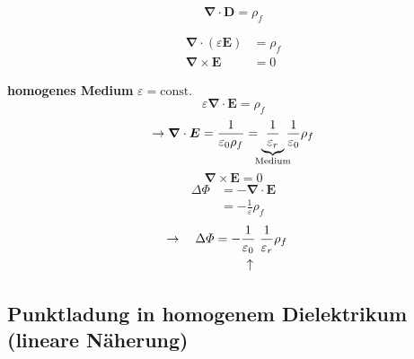 \documentclass[titlepage,11pt,a4paper,ngerman]{report}
\newcommand{\tx}[1]{\textrm{#1}}
\newcommand{\const}{\tx{const.}}
\newcommand{\ub}[1]{\underbrace{#1}}
\newcommand{\custo}[3]{\underset{\scriptstyle\overset{\mkern4mu\rotatebox{-90}{$\,#1$}}{#3}}{#2}}
\renewcommand{\Phi}{\varPhi}
\renewcommand{\vec}[1]{\boldsymbol{#1}}
\renewcommand{\epsilon}{\varepsilon}
\newcommand{\vabla}{\boldsymbol{\nabla}}
\newcommand{\rbox}[1]{\begin{tcolorbox}[colback=white,colframe=red!75!black]#1\end{tcolorbox}}
\begin{document}
\begin{equation*}
\vabla \cdot \vec{D} = \rho_f
\end{equation*}
\begin{center}
	\begin{minipage}{.5\linewidth}
		\rbox{
			\vspace{-12.5pt}
			\begin{align*}
			\vabla \cdot (\epsilon \vec{E}) &= \rho_f \\ 
			\vabla \times \vec{E} &= 0
			\end{align*}
		}
	\end{minipage}
\end{center}
\textbf{homogenes Medium} $ \epsilon = \const $
\begin{equation*}
\epsilon \vabla \cdot \vec{E} = \rho_f
\end{equation*}
\begin{equation*}
\rightarrow \vabla \cdot \vec{E} = \frac{1}{\epsilon_0 \rho_f} = \ub{\frac{1}{\epsilon_r}}_{\mathclap{\tx{Medium}}} \frac{1}{\epsilon_0} \rho_f
\end{equation*}
\begin{equation*}
\vabla \times \vec{E} = 0
\end{equation*}
\begin{align*}
\Delta \Phi &= - \vabla \cdot \vec{E} \\
&= - \frac{1}{\epsilon} \rho_f
\end{align*}
\begin{align*}
\rightarrow \quad \Delta \Phi &= - \custo{\leftarrow}{\frac{1}{\epsilon_0}}{} \ \frac{1}{\epsilon_r} \rho_f
\end{align*}

\subsection{Punktladung in homogenem Dielektrikum (lineare Näherung)} %
\end{document}
